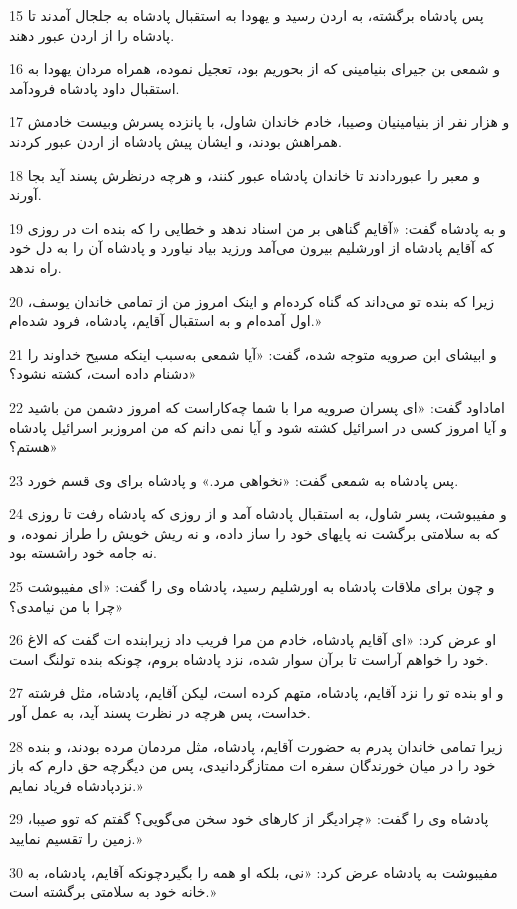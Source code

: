 \par 15 پس پادشاه برگشته، به اردن رسید و یهودا به استقبال پادشاه به جلجال آمدند تا پادشاه را از اردن عبور دهند.
\par 16 و شمعی بن جیرای بنیامینی که از بحوریم بود، تعجیل نموده، همراه مردان یهودا به استقبال داود پادشاه فرودآمد.
\par 17 و هزار نفر از بنیامینیان وصیبا، خادم خاندان شاول، با پانزده پسرش وبیست خادمش همراهش بودند، و ایشان پیش پادشاه از اردن عبور کردند.
\par 18 و معبر را عبوردادند تا خاندان پادشاه عبور کنند، و هر‌چه درنظرش پسند آید بجا آورند.
\par 19 و به پادشاه گفت: «آقایم گناهی بر من اسناد ندهد و خطایی را که بنده ات در روزی که آقایم پادشاه از اورشلیم بیرون می‌آمد ورزید بیاد نیاورد و پادشاه آن را به دل خود راه ندهد.
\par 20 زیرا که بنده تو می‌داند که گناه کرده‌ام و اینک امروز من از تمامی خاندان یوسف، اول آمده‌ام و به استقبال آقایم، پادشاه، فرود شده‌ام.»
\par 21 و ابیشای ابن صرویه متوجه شده، گفت: «آیا شمعی به‌سبب اینکه مسیح خداوند را دشنام داده است، کشته نشود؟»
\par 22 اماداود گفت: «ای پسران صرویه مرا با شما چه‌کاراست که امروز دشمن من باشید و آیا امروز کسی در اسرائیل کشته شود و آیا نمی دانم که من امروزبر اسرائیل پادشاه هستم؟»
\par 23 پس پادشاه به شمعی گفت: «نخواهی مرد.» و پادشاه برای وی قسم خورد.
\par 24 و مفیبوشت، پسر شاول، به استقبال پادشاه آمد و از روزی که پادشاه رفت تا روزی که به سلامتی برگشت نه پایهای خود را ساز داده، و نه ریش خویش را طراز نموده، و نه جامه خود راشسته بود.
\par 25 و چون برای ملاقات پادشاه به اورشلیم رسید، پادشاه وی را گفت: «ای مفیبوشت چرا با من نیامدی؟»
\par 26 او عرض کرد: «ای آقایم پادشاه، خادم من مرا فریب داد زیرابنده ات گفت که الاغ خود را خواهم آراست تا برآن سوار شده، نزد پادشاه بروم، چونکه بنده تولنگ است.
\par 27 و او بنده تو را نزد آقایم، پادشاه، متهم کرده است، لیکن آقایم، پادشاه، مثل فرشته خداست، پس هر‌چه در نظرت پسند آید، به عمل آور. 
\par 28 زیرا تمامی خاندان پدرم به حضورت آقایم، پادشاه، مثل مردمان مرده بودند، و بنده خود را در میان خورندگان سفره ات ممتازگردانیدی، پس من دیگر‌چه حق دارم که باز نزدپادشاه فریاد نمایم.»
\par 29 پادشاه وی را گفت: «چرادیگر از کارهای خود سخن می‌گویی؟ گفتم که توو صیبا، زمین را تقسیم نمایید.»
\par 30 مفیبوشت به پادشاه عرض کرد: «نی، بلکه او همه را بگیردچونکه آقایم، پادشاه، به خانه خود به سلامتی برگشته است.»
